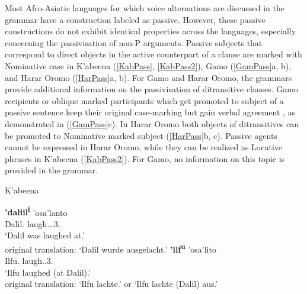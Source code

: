 Most Afro-Asiatic languages for which voice alternations are discussed in the grammar have a construction labeled as passive.
However, these passive constructions do not exhibit identical properties across the languages, especially concerning the passivisation of non-P arguments. 
Passive subjects that correspond to direct objects in the active counterpart of a clause are mark\-ed with Nominative  case in K'abeena (\ref{KabPass}, \ref{KabPass2}), Gamo (\ref{GamPass}a, b), and Harar Oromo (\ref{HarPass}a, b).
For Gamo and Harar Oromo, the grammars provide additional information on the passivisation of ditransitive clauses. 
Gamo recipients or oblique marked participants which get promoted to subject of a passive sentence keep their original case-marking but gain verbal agreement \citep[394]{Hompo:1990}, as demonstrated in (\ref{GamPass}c). 
In Harar Oromo both objects of ditransitives can be promoted to Nominative  marked subject (\ref{HarPass}b, c). 
Passive agents cannot be expressed in Harar Oromo, while they can be realized as Locative phrases in K'abeena (\ref{KabPass2}). 
For Gamo, no information on this topic is provided in the grammar.  

\begin{exe}\ex\label{KabPass} {K'abeena} \citep[275]{Crass:2005}\nopagebreak[4]
\begin{xlist}
\ex\gll \textbf{'daliil\textsuperscript{i}} 'osa'lanto\\
Dalil.\nom{} laugh.\pass{}.\pfv{}.3\sg{}.\fem{}\\
`Dalil was laughed at.'\\
original translation: `Dalil wurde ausgelacht.'
\ex\gll \textbf{'ilf\textsuperscript{u}} 'osa'lito\\
Ilfu.\nom{} laugh.\pfv{}.3\sg{}.\fem{}\\
`Ilfu laughed (at Dalil).'\\ 
original translation: `Ilfu lachte.' or `Ilfu lachte (Dalil) aus.'
\end{xlist}
\end{exe}

